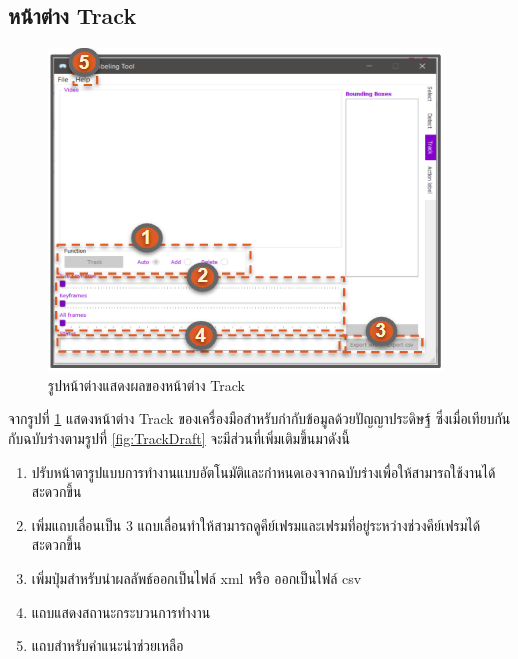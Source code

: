 \clearpage
\subsection*{หน้าต่าง Track}
\begin{figure}[!ht]
  \centering
    \includegraphics[scale=1.2]{chapter4/images/New_Final_ui/Track.png}
    \caption{รูปหน้าต่างแสดงผลของหน้าต่าง Track}
    \label{fig:final_track}
\end{figure}
จากรูปที่ \ref{fig:final_track} แสดงหน้าต่าง Track ของเครื่องมือสำหรับกำกับข้อมูลด้วยปัญญาประดิษฐ์ ซึ่งเมื่อเทียบกันกับฉบับร่างตามรูปที่ \ref{fig:TrackDraft} จะมีส่วนที่เพิ่มเติมขึ้นมาดังนี้
\begin{enumerate}
	\item ปรับหน้าตารูปแบบการทำงานแบบอัตโนมัติและกำหนดเองจากฉบับร่างเพื่อให้สามารถใช้งานได้สะดวกขึ้น
	\item เพิ่มแถบเลื่อนเป็น 3 แถบเลื่อนทำให้สามารถดูคีย์เฟรมและเฟรมที่อยู่ระหว่างช่วงคีย์เฟรมได้สะดวกขึ้น
	\item เพิ่มปุ่มสำหรับนำผลลัพธ์ออกเป็นไฟล์ xml  หรือ ออกเป็นไฟล์ csv
	\item แถบแสดงสถานะกระบวนการทำงาน
	\item แถบสำหรับคำแนะนำช่วยเหลือ
\end{enumerate}		

\clearpage
